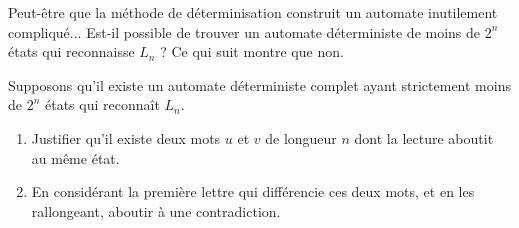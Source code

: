 \begin{exo}
Peut-être que la méthode de déterminisation construit un automate inutilement compliqué... Est-il possible de trouver un automate déterministe de moins de \(2^n\) états qui reconnaisse \(L_n\) ? Ce qui suit montre que non.

Supposons qu'il existe un automate déterministe complet ayant strictement moins de \(2^n\) états qui reconnaît \(L_n\).

\begin{enumerate}[resume=ex2.7]
    \item Justifier qu'il existe deux mots \(u\) et \(v\) de longueur \(n\) dont la lecture aboutit au même état. \\
    \item En considérant la première lettre qui différencie ces deux mots, et en les rallongeant, aboutir à une contradiction.
\end{enumerate}
\end{exo}

\begin{corr}
\end{corr}

